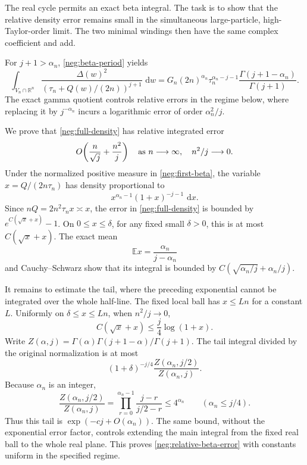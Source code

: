 \documentclass[11pt]{article}
\numberwithin{equation}{section}
\theoremstyle{definition}
\newcommand{\R}{\mathbb R}
\newcommand{\dd}{\,\mathrm d}
\begin{document}
The real cycle permits an exact beta integral. The task is to show
that the relative density error remains small in the simultaneous
large-particle, high-Taylor-order limit. The two minimal windings
then have the same complex coefficient and add.

For \(j+1>\alpha_n\), \eqref{neg:beta-period} yields
\begin{equation}
 \int_{V_n\cap\R^n}
 \frac{\Delta(w)^2}
      {(\tau_n+Q(w)/(2n))^{j+1}}\,\dd w
 =
 G_n(2n)^{\alpha_n}\tau_n^{\alpha_n-j-1}
       \frac{\Gamma(j+1-\alpha_n)}{\Gamma(j+1)}.
 \label{neg:first-beta}
\end{equation}
The exact gamma quotient controls relative errors in the regime below,
where replacing it by \(j^{-\alpha_n}\) incurs a logarithmic error of
order \(\alpha_n^2/j\).

We prove that \eqref{neg:full-density} has relative integrated
error
\begin{equation}
 O\!\left(\frac n{\sqrt j}+\frac{n^2}{j}\right)
 \quad\hbox{as }n\longrightarrow\infty,\quad n^2/j\longrightarrow0.
 \label{neg:relative-beta-error}
\end{equation}
Under the normalized positive measure in
\eqref{neg:first-beta}, the variable
\(x=Q/(2n\tau_n)\) has density proportional to
\[
 x^{\alpha_n-1}(1+x)^{-j-1}\,\dd x .
 \]
Since \(nQ=2n^2\tau_n x\asymp x\),
the error in \eqref{neg:full-density} is bounded by
\(e^{C(\sqrt x+x)}-1\).  On \(0\le x\le\delta\), for any
fixed small \(\delta>0\), this is at most \(C(\sqrt x+x)\).
The exact mean
\[
 \mathbb E x=\frac{\alpha_n}{j-\alpha_n}
 \]
and Cauchy--Schwarz show that its integral is bounded by
\(C(\sqrt{\alpha_n/j}+\alpha_n/j)\).

It remains to estimate the tail, where the preceding exponential
cannot be integrated over the whole half-line.  The fixed local
ball has \(x\le Ln\) for a constant \(L\).
Uniformly on \(\delta\le x\le Ln\), when \(n^2/j\to0\),
\[
 C(\sqrt x+x)\le\frac j4\log(1+x).
 \]
Write
\(Z(\alpha,j)=\Gamma(\alpha)\Gamma(j+1-\alpha)/\Gamma(j+1)\).
The tail integral divided by the original normalization is
at most
\[
 (1+\delta)^{-j/4}
       \frac{Z(\alpha_n,j/2)}{Z(\alpha_n,j)}.
 \]
Because \(\alpha_n\) is an integer,
\[
 \frac{Z(\alpha_n,j/2)}{Z(\alpha_n,j)}
 =\prod_{r=0}^{\alpha_n-1}
        \frac{j-r}{j/2-r}\le4^{\alpha_n}
                  \qquad(\alpha_n\le j/4).
 \]
Thus this tail is \(\exp(-cj+O(\alpha_n))\).
The same bound, without the exponential error factor,
controls extending the main integral from the fixed real
ball to the whole real plane.  This proves
\eqref{neg:relative-beta-error} with constants uniform in
the specified regime.
\end{document}
